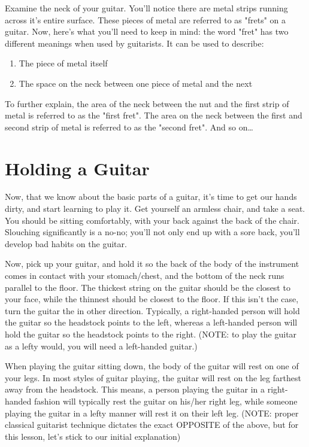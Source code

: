 Examine the neck of your guitar. You'll notice there are metal strips running
across it's entire surface. These pieces of metal are referred to as "frets" on
a guitar. Now, here's what you'll need to keep in mind: the word "fret" has two
different meanings when used by guitarists. It can be used to describe:
%
\begin{enumerate}
\item The piece of metal itself
\item The space on the neck between one piece of metal and the next 
\end{enumerate}
%
To further explain, the area of the neck between the nut and the first strip of
metal is referred to as the "first fret". The area on the neck between the
first and second strip of metal is referred to as the "second fret". And so
on\ldots{} 

\section{Holding a Guitar}
Now, that we know about the basic parts of a guitar, it's time to get our hands
dirty, and start learning to play it. Get yourself an armless chair, and take a
seat. You should be sitting comfortably, with your back against the back of the
chair. Slouching significantly is a no-no; you'll not only end up with a sore
back, you'll develop bad habits on the guitar.

Now, pick up your guitar, and hold it so the back of the body of the instrument
comes in contact with your stomach/chest, and the bottom of the neck runs
parallel to the floor. The thickest string on the guitar should be the closest
to your face, while the thinnest should be closest to the floor. If this isn't
the case, turn the guitar the in other direction. Typically, a right-handed
person will hold the guitar so the headstock points to the left, whereas a
left-handed person will hold the guitar so the headstock points to the right.
(NOTE: to play the guitar as a lefty would, you will need a left-handed
guitar.)

When playing the guitar sitting down, the body of the guitar will rest on one
of your legs. In most styles of guitar playing, the guitar will rest on the leg
farthest away from the headstock. This means, a person playing the guitar in a
right-handed fashion will typically rest the guitar on his/her right leg, while
someone playing the guitar in a lefty manner will rest it on their left leg.
(NOTE: proper classical guitarist technique dictates the exact OPPOSITE of the
above, but for this lesson, let's stick to our initial explanation)

